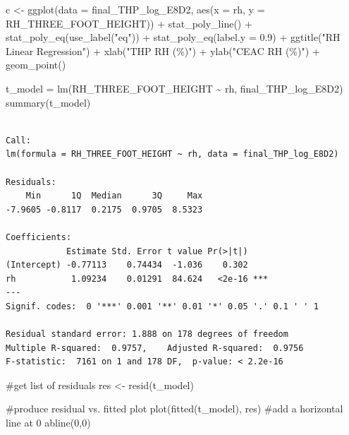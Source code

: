\documentclass[
  letterpaper,
  DIV=11,
  numbers=noendperiod]{scrartcl}
\newenvironment{Shaded}{\begin{snugshade}}{\end{snugshade}}
\newcommand{\AttributeTok}[1]{\textcolor[rgb]{0.40,0.45,0.13}{#1}}
\newcommand{\CommentTok}[1]{\textcolor[rgb]{0.37,0.37,0.37}{#1}}
\newcommand{\DecValTok}[1]{\textcolor[rgb]{0.68,0.00,0.00}{#1}}
\newcommand{\FloatTok}[1]{\textcolor[rgb]{0.68,0.00,0.00}{#1}}
\newcommand{\FunctionTok}[1]{\textcolor[rgb]{0.28,0.35,0.67}{#1}}
\newcommand{\NormalTok}[1]{\textcolor[rgb]{0.00,0.23,0.31}{#1}}
\newcommand{\OtherTok}[1]{\textcolor[rgb]{0.00,0.23,0.31}{#1}}
\newcommand{\SpecialCharTok}[1]{\textcolor[rgb]{0.37,0.37,0.37}{#1}}
\newcommand{\StringTok}[1]{\textcolor[rgb]{0.13,0.47,0.30}{#1}}
\begin{document}
\begin{Shaded}
\begin{Highlighting}[]
\NormalTok{c }\OtherTok{\textless{}{-}} \FunctionTok{ggplot}\NormalTok{(}\AttributeTok{data =}\NormalTok{ final\_THP\_log\_E8D2, }\FunctionTok{aes}\NormalTok{(}\AttributeTok{x =}\NormalTok{ rh, }\AttributeTok{y =}\NormalTok{ RH\_THREE\_FOOT\_HEIGHT)) }\SpecialCharTok{+}
  \FunctionTok{stat\_poly\_line}\NormalTok{() }\SpecialCharTok{+}
  \FunctionTok{stat\_poly\_eq}\NormalTok{(}\FunctionTok{use\_label}\NormalTok{(}\StringTok{"eq"}\NormalTok{)) }\SpecialCharTok{+}
  \FunctionTok{stat\_poly\_eq}\NormalTok{(}\AttributeTok{label.y =} \FloatTok{0.9}\NormalTok{) }\SpecialCharTok{+}
  \FunctionTok{ggtitle}\NormalTok{(}\StringTok{"RH Linear Regression"}\NormalTok{) }\SpecialCharTok{+}
  \FunctionTok{xlab}\NormalTok{(}\StringTok{"THP RH (\%)"}\NormalTok{) }\SpecialCharTok{+}
  \FunctionTok{ylab}\NormalTok{(}\StringTok{"CEAC RH (\%)"}\NormalTok{) }\SpecialCharTok{+}
  \FunctionTok{geom\_point}\NormalTok{()}


\NormalTok{  t\_model }\OtherTok{=} \FunctionTok{lm}\NormalTok{(RH\_THREE\_FOOT\_HEIGHT }\SpecialCharTok{\textasciitilde{}}\NormalTok{ rh, final\_THP\_log\_E8D2)}
  \FunctionTok{summary}\NormalTok{(t\_model)}
\end{Highlighting}
\end{Shaded}

\begin{verbatim}

Call:
lm(formula = RH_THREE_FOOT_HEIGHT ~ rh, data = final_THP_log_E8D2)

Residuals:
    Min      1Q  Median      3Q     Max 
-7.9605 -0.8117  0.2175  0.9705  8.5323 

Coefficients:
            Estimate Std. Error t value Pr(>|t|)    
(Intercept) -0.77113    0.74434  -1.036    0.302    
rh           1.09234    0.01291  84.624   <2e-16 ***
---
Signif. codes:  0 '***' 0.001 '**' 0.01 '*' 0.05 '.' 0.1 ' ' 1

Residual standard error: 1.888 on 178 degrees of freedom
Multiple R-squared:  0.9757,    Adjusted R-squared:  0.9756 
F-statistic:  7161 on 1 and 178 DF,  p-value: < 2.2e-16
\end{verbatim}

\begin{Shaded}
\begin{Highlighting}[]
\CommentTok{\#get list of residuals}
\NormalTok{res }\OtherTok{\textless{}{-}} \FunctionTok{resid}\NormalTok{(t\_model)}

\CommentTok{\#produce residual vs. fitted plot}
\FunctionTok{plot}\NormalTok{(}\FunctionTok{fitted}\NormalTok{(t\_model), res)}
\CommentTok{\#add a horizontal line at 0}
\FunctionTok{abline}\NormalTok{(}\DecValTok{0}\NormalTok{,}\DecValTok{0}\NormalTok{)}
\end{Highlighting}
\end{Shaded}
\end{document}
